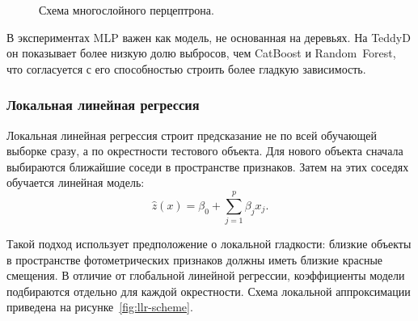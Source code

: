 \documentclass[12pt,a4paper]{article}
\begin{document}
\begin{figure}[h]
\centering
{}
\caption{Схема многослойного перцептрона.}
\label{fig:mlp-scheme}
\end{figure}

В экспериментах MLP важен как модель, не основанная на деревьях. На TeddyD он показывает более низкую долю выбросов, чем CatBoost и Random~Forest, что согласуется с его способностью строить более гладкую зависимость.

\subsubsection{Локальная линейная регрессия}

Локальная линейная регрессия строит предсказание не по всей обучающей выборке сразу, а по окрестности тестового объекта. Для нового объекта сначала выбираются ближайшие соседи в пространстве признаков. Затем на этих соседях обучается линейная модель:
\begin{equation}
\hat{z}(x) = \beta_0 + \sum_{j=1}^{p}\beta_j x_j.
\end{equation}

Такой подход использует предположение о локальной гладкости: близкие объекты в пространстве фотометрических признаков должны иметь близкие красные смещения. В отличие от глобальной линейной регрессии, коэффициенты модели подбираются отдельно для каждой окрестности. Схема локальной аппроксимации приведена на рисунке~\ref{fig:llr-scheme}.
\end{document}
